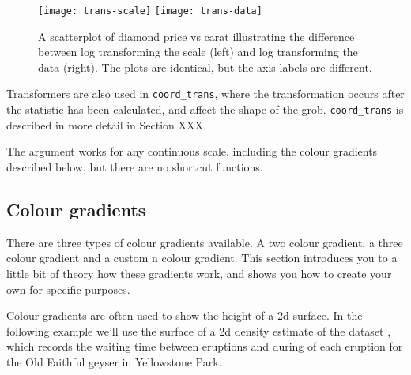 \begin{figure}[htbp]
  \centering
    \texttt{[image: trans-scale]}%
    \texttt{[image: trans-data]}
  \caption{A scatterplot of diamond price vs carat illustrating the difference between log transforming the scale (left) and log transforming the data (right).  The plots are identical, but the axis labels are different.}
  \label{fig:trans}
\end{figure}

Transformers are also used in \verb|coord_trans|, where the transformation occurs after the statistic has been calculated, and affect the shape of the grob.  \verb|coord_trans| is described in more detail in Section XXX.

The  argument works for any continuous scale, including the colour gradients described below, but there are no shortcut functions.

\subsection{Colour gradients}
\label{sub:scale-gradient}

There are three types of colour gradients available.  A two colour gradient, a three colour gradient and a custom n colour gradient.  This section introduces you to a little bit of theory how these gradients work, and shows you how to create your own for specific purposes.



Colour gradients are often used to show the height of a 2d surface.  In the following example we'll use the surface of a 2d density estimate of the  dataset \citep{azzalini:1990}, which records the waiting time between eruptions and during of each eruption for the Old Faithful geyser in Yellowstone Park.  

